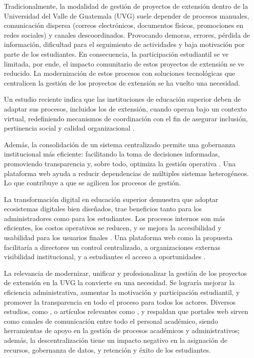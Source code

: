 Tradicionalmente, la modalidad de gestión de proyectos de extensión dentro de la Universidad del Valle de Guatemala 
(UVG) suele depender de procesos manuales, comunicación dispersa (correos electrónicos, documentos físicos, 
promociones en redes sociales) y canales descoordinados. Provocando demoras, errores, pérdida de información, 
dificultad para el seguimiento de actividades y baja motivación por parte de los estudiantes. En consecuencia, 
la participación estudiantil se ve limitada, por ende, el impacto comunitario de estos proyectos de extensión se 
ve reducido. La modernización de estos procesos con soluciones tecnológicas que centralicen la gestión de los 
proyectos de extensión se ha vuelto una necesidad.

Un estudio reciente indica que las instituciones de educación superior deben de adaptar sus procesos, incluidos 
los de extensión, cuando operan bajo un contexto virtual, redefiniendo mecanismos de coordinación con el fin de 
asegurar inclusión, pertinencia social y calidad organizacional \cite{garcia2024gestion}.

Además, la consolidación de un sistema centralizado permite una gobernanza institucional más eficiente: facilitando 
la toma de decisiones informadas, promoviendo transparencia y, sobre todo, optimiza la gestión operativa \cite{barajas2024data}. 
Una plataforma web ayuda a reducir dependencias de múltiples sistemas heterogéneos. Lo que contribuye a que se 
agilicen los procesos de gestión.

La transformación digital en educación superior demuestra que adoptar ecosistemas digitales bien diseñados, 
trae beneficios tanto para los administradores como para los estudiantes. Los procesos internos son más eficientes, 
los costos operativos se reducen, y se mejora la accesibilidad y usabilidad para los usuarios finales \cite{pagerDuty2025digitalTransformation}. 
Una plataforma web como la propuesta facilitaría a directores un control centralizado, a organizaciones externas 
visibilidad institucional, y a estudiantes el acceso a oportunidades \cite{urmeneta2025design}.

La relevancia de modernizar, unificar y profesionalizar la gestión de los proyectos de extensión en la UVG la 
convierte en una necesidad. Se lograría mejorar la eficiencia administrativa, aumentar la motivación y participación 
estudiantil, y promover la transparencia en todo el proceso para todos los actores. Diversos estudios, como \cite{PINHO201880}, 
o artículos relevantes como \cite{barajas2024data}, \cite{pagerDuty2025digitalTransformation} y \cite{harper2021digitalTransformation} 
respaldan que portales web sirven como canales de comunicación entre 
todo el personal académico, siendo herramientas de apoyo en la gestión de procesos académicos y administrativos; 
además, la descentralización tiene un impacto negativo en la asignación de recursos, gobernanza de datos, y 
retención y éxito de los estudiantes.

